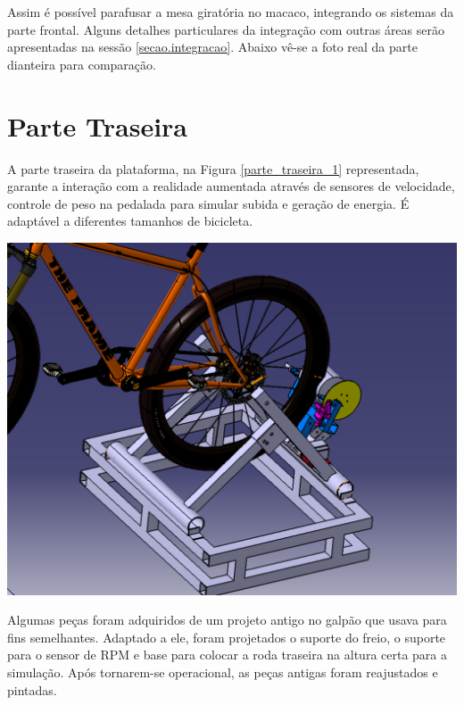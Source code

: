 	Assim é possível parafusar a mesa giratória no macaco, integrando os sistemas da parte frontal. Alguns detalhes particulares da integração com outras áreas serão apresentadas na sessão \ref{secao.integracao}. Abaixo vê-se a foto real da parte dianteira para comparação.
	

\section{Parte Traseira}
    A parte traseira da plataforma, na Figura \ref{parte_traseira_1} representada, garante a interação com a realidade aumentada através de sensores de velocidade, controle de peso na pedalada para simular subida e geração de energia. É adaptável a diferentes tamanhos de bicicleta.
 
    \begin{center}
    	\includegraphics[scale=0.5]{figuras/parte_traseira}
        \label{parte_traseira_1}
    \end{center}    


   Algumas peças foram adquiridos de um projeto antigo no galpão que usava para fins semelhantes. Adaptado a ele, foram projetados o suporte do freio, o suporte para o sensor de RPM e base para colocar a roda traseira na altura certa para a simulação. Após tornarem-se operacional, as peças antigas foram reajustados e pintadas.

